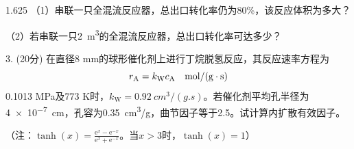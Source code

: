 \documentclass[12pt, b5paper]{article}
\begin{document}
\begin{spacing}{1.625}
（1）串联一只全混流反应器，总出口转化率仍为80\%，该反应体积为多大？

（2）若串联一只\SI{2}{m^3}的全混流反应器，总出口转化率可达多少？


\bigskip
\bigskip

3. (20分) 在直径8 mm的球形催化剂上进行丁烷脱氢反应，其反应速率方程为
\vspace{-1.5em}
\[
	r_{\mathrm{A}} =k_{\mathrm{W}} c_{\mathrm{A}} \quad \mathrm{mol} /(\mathrm{g} \cdot \mathrm{s})
	\vspace{-1.5em}
\]
0.1013 MPa及773 K时，$k_\mathrm{W} = \SI{0.92}{cm^3/(g.s)}$。若催化剂平均孔半径为\SI{4e-7}{cm}，孔容为\SI{0.35}{cm^3/g}，曲节因子等于2.5。试计算内扩散有效因子。

（注：$\tanh (x) = \frac{\mathrm{e}^x - \mathrm{e}^{-x}}{\mathrm{e}^x + \mathrm{e}^{-x}}$。当$x>3$时，$\tanh (x) = 1$）


\end{spacing}
\end{document}
